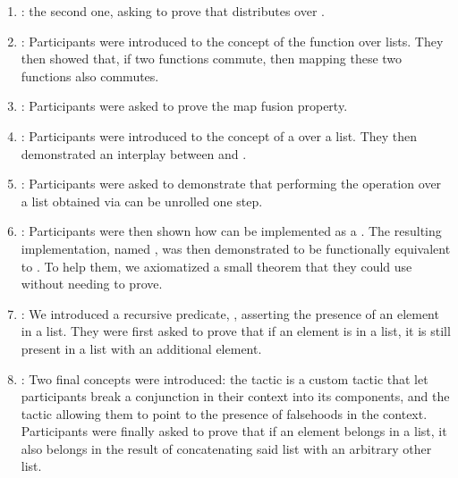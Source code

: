 \begin{enumerate}
  \item {}: the second one, asking to prove
that  distributes over .

  \item {}: Participants were introduced to the concept of
the function  over lists.  They then showed that, if two
functions commute, then mapping these two functions also commutes.

  \item {}: Participants were asked to prove the map fusion
property.

  \item {}: Participants were introduced to the concept of a
 over a list.  They then demonstrated an interplay between
 and .

  \item {}: Participants were asked to demonstrate that
performing the operation  over a list obtained via
 can be unrolled one step.

  \item {}: Participants were then shown how 
can be implemented as a .  The resulting implementation, named
, was then demonstrated to be functionally equivalent to
.  To help them, we axiomatized a small theorem that they could
use without needing to prove.

  \item {}: We introduced a recursive predicate,
, asserting the presence of an element in a list.  They were first
asked to prove that if an element is in a list, it is still present in a list
with an additional element.

  \item {}: Two final concepts were introduced: the
 tactic is a custom tactic that let participants break a
conjunction in their context into its components, and the
 tactic allowing them to point to the presence of
falsehoods in the context.  Participants were finally asked to prove that if an
element belongs in a list, it also belongs in the result of concatenating said
list with an arbitrary other list.

\end{enumerate}

